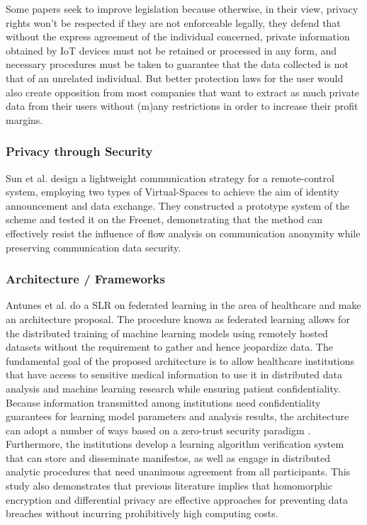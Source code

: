 Some papers seek to improve legislation \cite{WEBER2015618, FabianoInternet}
because otherwise, in their view, privacy rights won't be respected if they
are not enforceable legally, they defend that without the express agreement
of the individual concerned, private information obtained by IoT devices
must not be retained or processed in any form, and necessary procedures
must be taken to guarantee that the data collected is not that of an unrelated
individual. But better protection laws for the user would also create opposition
from most companies that want to extract as much private data from their
users without (m)any restrictions in order to increase their profit margins.

\subsubsection{Privacy through Security}

Sun et al. \cite{SunSecure} design a lightweight communication strategy
for a remote-control system, employing two types of Virtual-Spaces to achieve
the aim of identity announcement and data exchange. They constructed a prototype
system of the scheme and tested it on the Freenet, demonstrating that the
method can effectively resist the influence of flow analysis on communication
anonymity while preserving communication data security.

\subsubsection{Architecture / Frameworks}

Antunes et al. \cite{AntunesFederated} do a SLR on federated learning in
the area of healthcare and make an architecture proposal. The procedure
known as federated learning allows for the distributed training of machine
learning models using remotely hosted datasets without the requirement to
gather and hence jeopardize data. The fundamental goal of the proposed architecture is
to allow healthcare institutions that have access to sensitive medical information
to use it in distributed data analysis and machine learning research while
ensuring patient confidentiality. Because information transmitted among
institutions need confidentiality guarantees for learning model parameters
and analysis results, the architecture can adopt a number of ways based on
a zero-trust security paradigm \cite{ChenSecurity}. Furthermore, the institutions
develop a learning algorithm verification system that can store and disseminate
manifestos, as well as engage in distributed analytic procedures that need
unanimous agreement from all participants. This study also demonstrates
that previous literature implies that homomorphic encryption and differential
privacy are effective approaches for preventing data breaches without incurring
prohibitively high computing costs.

